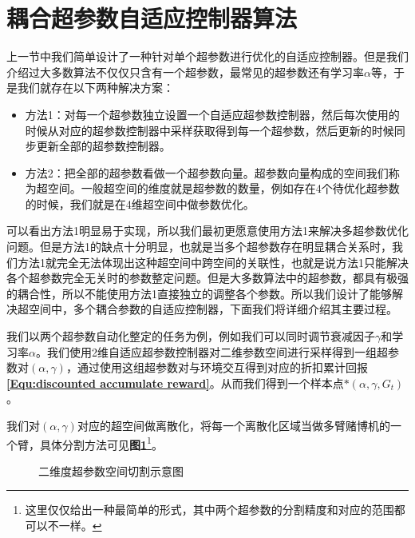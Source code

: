 \section{耦合超参数自适应控制器算法}

上一节中我们简单设计了一种针对单个超参数进行优化的自适应控制器。但是我们介绍过大多数算法不仅仅只含有一个超参数，最常见的超参数还有学习率$\alpha$等，于是我们就存在以下两种解决方案：

\begin{itemize}
    \item 方法1：对每一个超参数独立设置一个自适应超参数控制器，然后每次使用的时候从对应的超参数控制器中采样获取得到每一个超参数，然后更新的时候同步更新全部的超参数控制器。
    \item 方法2：把全部的超参数看做一个超参数向量。超参数向量构成的空间我们称为超空间。一般超空间的维度就是超参数的数量，例如存在4个待优化超参数的时候，我们就是在4维超空间中做参数优化。
\end{itemize} 

可以看出方法1明显易于实现，所以我们最初更愿意使用方法1来解决多超参数优化问题。但是方法1的缺点十分明显，也就是当多个超参数存在明显耦合关系时，我们方法1就完全无法体现出这种超空间中跨空间的关联性，也就是说方法1只能解决各个超参数完全无关时的参数整定问题。但是大多数算法中的超参数，都具有极强的耦合性，所以不能使用方法1直接独立的调整各个参数。所以我们设计了能够解决超空间中，多个耦合参数的自适应控制器，下面我们将详细介绍其主要过程。

我们以两个超参数自动化整定的任务为例，例如我们可以同时调节衰减因子$\gamma$和学习率$\alpha$。我们使用2维自适应超参数控制器对二维参数空间进行采样得到一组超参数对$(\alpha,\gamma)$，通过使用这组超参数对与环境交互得到对应的折扣累计回报\textbf{\eqref{Equ:discounted accumulate reward}}。从而我们得到一个样本点$*(\alpha,\gamma,G_t)$。

我们对$(\alpha,\gamma)$对应的超空间做离散化，将每一个离散化区域当做多臂赌博机的一个臂，具体分割方法可见\textbf{图\ref{Fig: gamma alpha tile}}\footnote{这里仅仅给出一种最简单的形式，其中两个超参数的分割精度和对应的范围都可以不一样。}。

\begin{figure}[!t]
	\centering
	\caption{二维度超参数空间切割示意图}
	\label{Fig: gamma alpha tile}
\end{figure}

